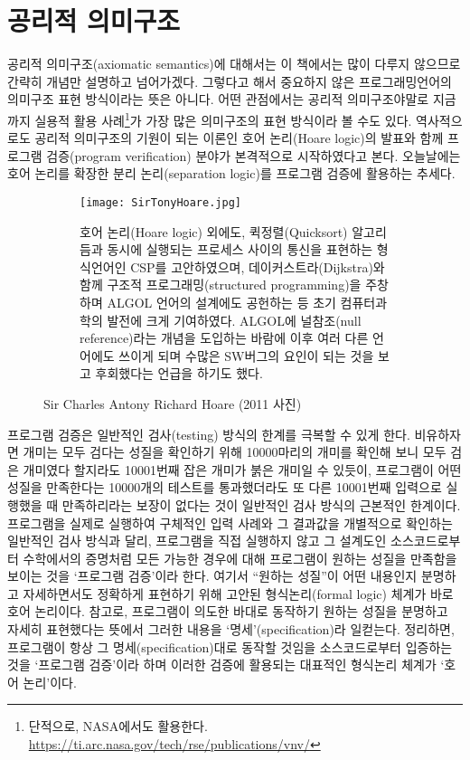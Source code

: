 \section{공리적 의미구조}
공리적 의미구조(axiomatic semantics)에 대해서는 이 책에서는 많이 다루지
않으므로 간략히 개념만 설명하고 넘어가겠다. 그렇다고 해서 중요하지 않은
프로그래밍언어의 의미구조 표현 방식이라는 뜻은 아니다. 어떤 관점에서는
공리적 의미구조야말로 지금까지 실용적 활용 사례\footnote{단적으로,
  NASA에서도 활용한다.
  \url{https://ti.arc.nasa.gov/tech/rse/publications/vnv/}}가 가장 많은
의미구조의 표현 방식이라 볼 수도 있다. 역사적으로도 공리적 의미구조의
기원이 되는 이론인 호어 논리(Hoare logic)\cite{Hoare69}의 발표와 함께
프로그램 검증(program verification) 분야가 본격적으로
시작하였다\cite{GSLeeHJKim20Hoare}고 본다. 오늘날에는 호어 논리를
확장한 분리 논리(separation logic)\cite{IshtiaqOHearn01,
OHearnReynoldsYang01}를 프로그램 검증에 활용하는 추세다.

\begin{figure}
\begin{subfigure}{.33\textwidth}
\texttt{[image: SirTonyHoare.jpg]}
\end{subfigure}
\begin{subfigure}{.65\textwidth}\small
호어 논리(Hoare logic) 외에도, 퀵정렬(Quicksort) 알고리듬과
동시에 실행되는 프로세스 사이의 통신을 표현하는 형식언어인
CSP를 고안하였으며, 데이커스트라(Dijkstra)와 함께
구조적 프로그래밍(structured programming)을 주창하며
ALGOL 언어의 설계에도 공헌하는 등 초기 컴퓨터과학의 발전에
크게 기여하였다. ALGOL에 널참조(null reference)라는 개념을
도입하는 바람에 이후 여러 다른 언어에도 쓰이게 되며 수많은
SW버그의 요인이 되는 것을 보고 후회했다는 언급을 하기도 했다.
\end{subfigure}
\caption{Sir Charles Antony Richard Hoare (2011 사진) \label{fig:Hoare}}
\end{figure}


프로그램 검증은 일반적인 검사(testing) 방식의 한계를 극복할 수 있게 한다.
비유하자면 개미는 모두 검다는 성질을 확인하기 위해 10000마리의 개미를
확인해 보니 모두 검은 개미였다 할지라도 10001번째 잡은 개미가 붉은
개미일 수 있듯이, 프로그램이 어떤 성질을 만족한다는 10000개의 테스트를
통과했더라도 또 다른 10001번째 입력으로 실행했을 때 만족하리라는 보장이
없다는 것이 일반적인 검사 방식의 근본적인 한계이다. 프로그램을 실제로
실행하여 구체적인 입력 사례와 그 결과값을 개별적으로 확인하는 일반적인
검사 방식과 달리, 프로그램을 직접 실행하지 않고 그 설계도인 소스코드로부터
수학에서의 증명처럼 모든 가능한 경우에 대해 프로그램이 원하는 성질을
만족함을 보이는 것을 `프로그램 검증'이라 한다. 여기서 ``원하는 성질''이
어떤 내용인지 분명하고 자세하면서도 정확하게 표현하기 위해 고안된
형식논리(formal logic) 체계가 바로 호어 논리이다. 참고로, 프로그램이
의도한 바대로 동작하기 원하는 성질을 분명하고 자세히 표현했다는 뜻에서
그러한 내용을 `명세'(specification)라 일컫는다. 정리하면, 프로그램이
항상 그 명세(specification)대로 동작할 것임을 소스코드로부터 입증하는
것을 `프로그램 검증'이라 하며 이러한 검증에 활용되는 대표적인 형식논리
체계가 `호어 논리'이다.

